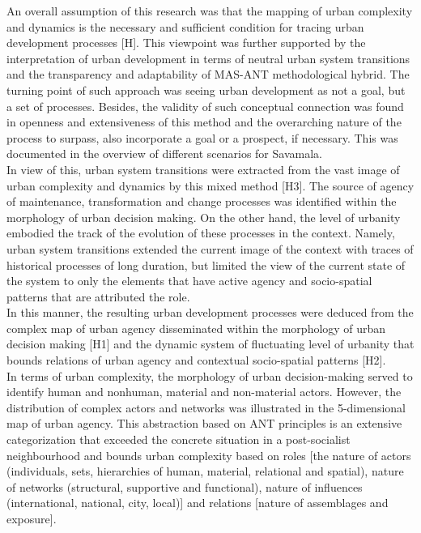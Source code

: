 \documentclass[11pt]{report}
\begin{document}
An overall assumption of this research was that the mapping of urban complexity and dynamics is the necessary and sufficient condition for tracing urban development processes [H].
This viewpoint was further supported by the interpretation of urban development in terms of neutral urban system transitions and the transparency and adaptability of MAS-ANT methodological hybrid.
The turning point of such approach was seeing urban development as not a goal, but a set of processes.
Besides, the validity of such conceptual connection was found in openness and extensiveness of this method and the overarching nature of the process to surpass, also incorporate a goal or a prospect, if necessary.
This was documented in the overview of different scenarios for Savamala.
\\
In view of this, urban system transitions were extracted from the vast image of urban complexity and dynamics by this mixed method [H3]. The source of agency of maintenance, transformation and change processes was identified within the morphology of urban decision making. On the other hand, the level of urbanity embodied the track of the evolution of these processes in the context.
Namely, urban system transitions extended the current image of the context with traces of historical processes of long duration, but limited the view of the current state of the system to only the elements that have active agency and socio-spatial patterns that are attributed the role.
\\
In this manner, the resulting urban development processes were deduced from the complex map of urban agency disseminated within the morphology of urban decision making [H1] and the dynamic system of fluctuating level of urbanity that bounds relations of urban agency and contextual socio-spatial patterns [H2].
\\
In terms of urban complexity, the morphology of urban decision-making served to identify human and nonhuman, material and non-material actors. However, the distribution of complex actors and networks was illustrated in the 5-dimensional map of urban agency.
This abstraction based on ANT principles is an extensive categorization that exceeded the concrete situation in a post-socialist neighbourhood and bounds urban complexity based on roles [the nature of actors (individuals, sets, hierarchies of human, material, relational and spatial), nature of networks (structural, supportive and functional), nature of influences (international, national, city, local)] and relations [nature of assemblages and exposure].
\\
\end{document}
